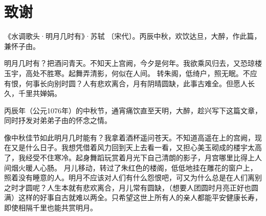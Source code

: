 \chapter*{致谢}
\thispagestyle{fancy}

《水调歌头·明月几时有》·苏轼 〔宋代〕。丙辰中秋，欢饮达旦，大醉，作此篇，兼怀子由。

明月几时有？把酒问青天。不知天上宫阙，今夕是何年。我欲乘风归去，又恐琼楼玉宇，高处不胜寒。起舞弄清影，何似在人间。
转朱阁，低绮户，照无眠。不应有恨，何事长向别时圆？人有悲欢离合，月有阴晴圆缺，此事古难全。但愿人长久，千里共婵娟。

丙辰年（公元1076年）的中秋节，通宵痛饮直至天明，大醉，趁兴写下这篇文章，同时抒发对弟弟子由的怀念之情。

像中秋佳节如此明月几时能有？我拿着酒杯遥问苍天。不知道高遥在上的宫阙，现在又是什么日子。我想凭借着风力回到天上去看一看，又担心美玉砌成的楼宇太高了，我经受不住寒冷。起身舞蹈玩赏着月光下自己清朗的影子，月宫哪里比得上人间烟火暖人心肠。
月儿移动，转过了朱红色的楼阁，低低地挂在雕花的窗户上，照着没有睡意的人。明月不应该对人们有什么怨恨吧，可又为什么总是在人们离别之时才圆呢？人生本就有悲欢离合，月儿常有圆缺，（想要人团圆时月亮正好也圆满）这样的好事自古就难以两全。只希望这世上所有人的亲人都能平安健康长寿，即使相隔千里也能共赏明月。
